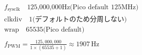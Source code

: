 \begin{align*}
& f_{\mathrm{sysclk}} \quad \text{125,000,000Hz(Pico default 125MHz)} \\
& \mathrm{clkdiv}  \quad \text{1(デフォルトのため分周しない)} \\
& \mathrm{wrap}    \quad \text{65535(Pico default)} \\
\\
& f_{\mathrm{PWM}}  = \frac{125,000,000}{1 \times (65535 + 1)} \approx 1907 \, \text{Hz}
\end{align*}